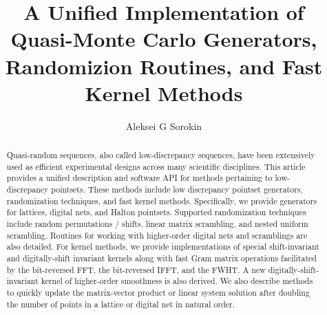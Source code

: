 \documentclass[acmsmall]{acmart}
\begin{document}
\title{A Unified Implementation of Quasi-Monte Carlo Generators, Randomizion Routines, and Fast Kernel Methods}

\author{Aleksei G Sorokin}



\begin{abstract}
    Quasi-random sequences, also called low-discrepancy sequences, have been extensively used as efficient experimental designs across many scientific disciplines. This article provides a unified description and software API for methods pertaining to low-discrepancy pointsets. These methods include low discrepancy pointset generators, randomization techniques, and fast kernel methods. Specifically, we provide generators for lattices, digital nets, and Halton pointsets. Supported randomization techniques include random permutations / shifts, linear matrix scrambling, and nested uniform scrambling. Routines for working with higher-order digital nets and scramblings are also detailed. For kernel methods, we provide implementations of special shift-invariant and digitally-shift invariant kernels along with fast Gram matrix operations facilitated by the bit-reversed FFT, the bit-reversed IFFT, and the FWHT. A new digitally-shift-invariant kernel of higher-order smoothness is also derived. We also describe methods to quickly update the matrix-vector product or linear system solution after doubling the number of points in a lattice or digital net in natural order.
    
    

\end{abstract}
\end{document}
